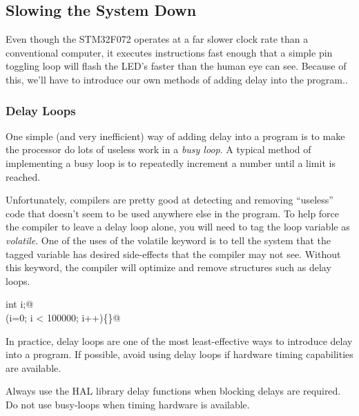 \documentclass[11pt,fleqn]{book} %
\begin{document}
\subsection{Slowing the System Down}
Even though the STM32F072 operates at a far slower clock rate than a conventional computer, it executes instructions fast enough that a simple pin toggling loop will flash the LED's faster than the human eye can see. Because of this, we'll have to introduce our own methods of adding delay into the program..

\subsubsection{Delay Loops}
One simple (and very inefficient) way of adding delay into a program is to make the processor do lots of useless work in a \textit{busy loop}. A typical method of implementing a busy loop is to repeatedly increment a number until a limit is reached.

Unfortunately, compilers are pretty good at detecting and removing ``useless'' code that doesn't seem to be used anywhere else in the program. To help force the compiler to leave a delay loop alone, you will need to tag the loop variable as \textit{volatile}. One of the uses of the volatile keyword is to tell the system that the tagged variable has desired side-effects that the compiler may not see. Without this keyword, the compiler will optimize and remove structures such as delay loops.


\smallskip
\colorbox{gray!20!white}{
    \centering
    \parbox{\linewidth-2\fboxsep}{
        \lstinline@volatile int i;@ \\
        \lstinline@for(i=0; i < 100000; i++)\{\}@ 
    }
}
\smallskip

In practice, delay loops are one of the most least-effective ways to introduce delay into a program. If possible, avoid using delay loops if hardware timing capabilities are available. 

\begin{warning}
    Always use the HAL library delay functions when blocking delays are required. Do not use busy-loops when timing hardware is available.
\end{warning}
\end{document}
